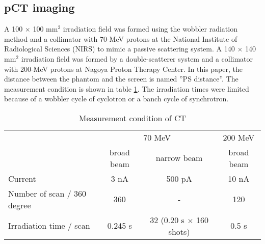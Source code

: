 \documentclass[preprint,3pt]{elsarticle} %
\begin{document}
{\subsection{pCT imaging}
	A 100 $\times$ 100 mm$^{2}$ irradiation field was formed using the wobbler radiation method and a collimator with 70-MeV protons at the National Institute of Radiological Sciences (NIRS) to mimic a passive scattering system. A 140 $\times$ 140 mm$^{2}$ irradiation field was formed by a double-scatterer system and a collimator with 200-MeV protons at Nagoya Proton Therapy Center. In this paper, the distance between the phantom and the screen is named ''PS distance''. The measurement condition is shown in table \ref{condition}. The irradiation times were limited because of a wobbler cycle of cyclotron or a banch cycle of synchrotron.\\
\begin{table}[H]
\centering
\begin{tabular}{p{5cm}ccc} 
\hline
 & \multicolumn{2}{c}{70 MeV} & 200 MeV\\ 
 & broad beam & narrow beam & broad beam\\
\hline
Current & 3 nA & 500 pA & 10 nA \\
Number of scan / 360 degree & 360 & - & 120 \\
Irradiation time / scan & 0.245 s & 32 (0.20 s $\times$ 160 shots) & 0.5 s\\
\hline
\end{tabular}
\caption{Measurement condition of CT}
\label{condition}
\end{table}

}
\end{document}
